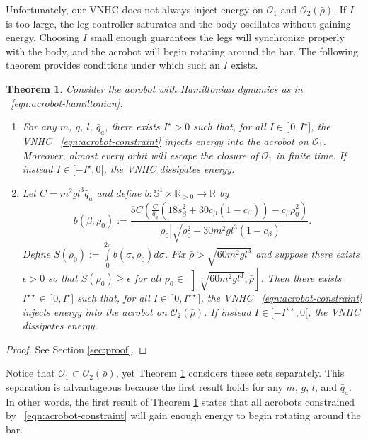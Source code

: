 \documentclass[journal,twoside,web]{ieeecolor}
\newtheorem{thm}{Theorem}%
\newcommand*{\R}{\mathbb{R}}
\newcommand*{\Sone}{\mathbb{S}^1}
\newcommand*{\SxR}{\Sone \times \R}
\begin{document}
Unfortunately, our VNHC does not always inject energy on \(\mathcal{O}_1\) and
\(\mathcal{O}_2(\bar{\rho})\).
If \(I\) is too large, the leg controller saturates and the body oscillates
without gaining energy.
Choosing \(I\) small enough guarantees the legs will synchronize
properly with the body, and the acrobot will begin rotating around the bar.
The following theorem provides conditions under which such an \(I\) exists.

\begin{thm}\label{thm:acrobot-energy-stabilization}
    Consider the acrobot with Hamiltonian dynamics as in ~\eqref{eqn:acrobot-hamiltonian}.
\begin{enumerate}
    \item For any \(m\), \(g\), \(l\), \(\bar{q}_a\), there exists
        \(I^\star > 0\) such that, for all \(I \in \, ]0,I^\star]\), the VNHC
        ~\eqref{eqn:acrobot-constraint} injects energy into the acrobot on
        \(\mathcal{O}_1\).
        Moreover, almost every orbit will escape the closure of
        \(\mathcal{O}_1\) in finite time.
        If instead \(I \in [-I^\star,0[\), the VNHC dissipates energy.
    \item Let \(C = m^2gl^3\bar{q}_a\) and 
        define \(b : \SxR_{> 0} \rightarrow \R\) by
    \[
        b(\beta,\rho_0) := 
        \frac{5C \left(
        \frac{C}{\bar{q}_a}\left(18s_\beta^2 + 30c_\beta(1 - c_\beta)\right)
            - c_\beta\rho_0^2
        \right)}{
        |\rho_0|\sqrt{\rho_0^2 - 30m^2gl^3(1 - c_\beta)}
        }
        .
    \]
        Define 
        \(S(\rho_0) := \int \limits_{0}^{2\pi} b(\sigma,\rho_0)d\sigma\).
        Fix \(\bar{\rho} > \sqrt{60m^2gl^3}\) and
        suppose there exists \(\epsilon > 0\) so that 
        \(S(\rho_0) \geq \epsilon\) for all 
        \(\rho_0 \in \, \left]\sqrt{60m^2gl^3}, \bar{\rho}\right]\).
        Then there exists \(I^{\star\star} \in \, ]0, I^\star]\) such that, for all 
        \(I \in \, ]0,I^{\star\star}]\), the VNHC
        ~\eqref{eqn:acrobot-constraint} injects energy into the acrobot on
        \(\mathcal{O}_2(\bar{\rho})\).
        If instead \(I \in [-I^{\star\star},0[\), the VNHC dissipates energy.
\end{enumerate}
\end{thm}
\begin{proof}
    See Section \ref{sec:proof}.
\end{proof}

Notice that \(\mathcal{O}_1 \subset \mathcal{O}_2(\bar{\rho})\), yet
Theorem \ref{thm:acrobot-energy-stabilization} considers these sets separately.
This separation is advantageous because the first result holds for any
\(m\), \(g\), \(l\), and \(\bar{q}_a\). 
In other words, the first result of Theorem
\ref{thm:acrobot-energy-stabilization} states that all acrobots constrained by
~\eqref{eqn:acrobot-constraint} will gain enough energy to begin rotating around
the bar.
\end{document}
